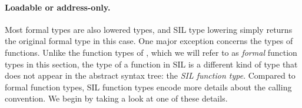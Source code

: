\documentclass[../generics]{subfiles}
\begin{document}
\paragraph{Loadable or address-only.}
Most formal types are also lowered types, and SIL type lowering simply returns the original formal type in this case. One major exception concerns the types of functions. Unlike the function types of , which we will refer to as \emph{formal} function types in this section, the type of a function in SIL is a different kind of type that does not appear in the abstract syntax tree: the \emph{SIL function type}. Compared to formal function types, SIL function types encode more details about the calling convention. We begin by taking a look at one of these details.
\end{document}
